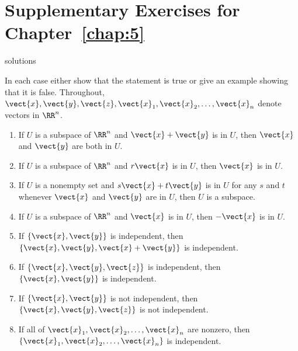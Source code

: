 \section*{Supplementary Exercises for Chapter~\ref{chap:5}}

\begin{Filesave}{solutions}
\end{Filesave}

\vspace*{-1em}
\begin{multicols}{2}
\begin{supex}
In each case either show that the statement is true or give an example showing that it is false. Throughout, $\vect{x}, \vect{y}, \vect{z}, \vect{x}_{1}, \vect{x}_{2}, \dots, \vect{x}_{n}$ denote vectors in $\RR^n$.

\begin{enumerate}[label={\alph*.}]
\item If $U$ is a subspace of $\RR^n$ and $\vect{x} + \vect{y}$ is in $U$, then $\vect{x}$ and $\vect{y}$ are both in $U$.

\item If $U$ is a subspace of $\RR^n$ and $r\vect{x}$ is in $U$, then $\vect{x}$ is in $U$.

\item If $U$ is a nonempty set and $s\vect{x} + t\vect{y}$ is in $U$ for any $s$ and $t$ whenever $\vect{x}$ and $\vect{y}$ are in $U$, then $U$ is a subspace.

\item If $U$ is a subspace of $\RR^n$ and $\vect{x}$ is in $U$, then $-\vect{x}$ is in $U$.

\item If $\{\vect{x}, \vect{y}\}$ is independent, then $\{\vect{x}, \vect{y}, \vect{x} + \vect{y}\}$ is independent.

\item If $\{\vect{x}, \vect{y}, \vect{z}\}$ is independent, then $\{\vect{x}, \vect{y}\}$ is independent.

\item If $\{\vect{x}, \vect{y}\}$ is not independent, then $\{\vect{x}, \vect{y}, \vect{z}\}$ is not independent.

\item If all of $\vect{x}_{1}, \vect{x}_{2}, \dots, \vect{x}_{n}$ are nonzero, then $\{\vect{x}_{1}, \vect{x}_{2}, \dots, \vect{x}_{n}\}$ is independent.


\end{enumerate}
\end{supex}
\end{multicols}
